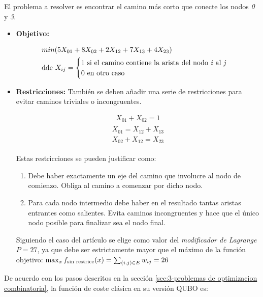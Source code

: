 El problema a resolver es encontrar el camino más corto que conecte los nodos \textit{0} y \textit{3}.
\begin{itemize}
\item \textbf{Objetivo:}

  \begin{align*}
    &min(5X_{01} + 8X_{02} + 2X_{12} + 7X_{13} + 4X_{23}) \\
    &\textnormal{dde } X_{ij} = \begin{cases}
      1 \textnormal{ si el camino contiene la arista del nodo \textit{i} al \textit{j}} \\
      0 \textnormal{ en otro caso}
    \end{cases}
  \end{align*}
  
\item \textbf{Restricciones:}
  También se deben añadir una serie de restricciones para evitar caminos triviales o incongruentes.

  \begin{align}
    X_{01} + X_{02} = 1
  \end{align}
  \begin{align}
    \begin{split}
      X_{01} = X_{12} + X_{13} \\
      X_{02} + X_{12} = X_{23}
    \end{split}
  \end{align}

  Estas restricciones se pueden justificar como:
  \begin{enumerate}
  \item Debe haber exactamente un eje del camino que involucre al nodo de comienzo. Obliga al camino a comenzar por dicho nodo.
  \item Para cada nodo intermedio debe haber en el resultado tantas aristas entrantes como salientes. Evita caminos incongruentes y hace que el único nodo posible para finalizar sea el nodo final.
    
  \end{enumerate}
  Siguiendo el caso del artículo se elige como valor del \textit{modificador de Lagrange} \(P=27\), ya que debe ser estrictamente mayor que el máximo de la función objetivo:
  \(\max_{x}{f_{\textnormal{sin restricc}}(x)} = \sum_{(i, j)\in{E}}{w_{ij}} = 26\)

\end{itemize}

De acuerdo con los pasos descritos en la sección \ref{sec:3-problemas de optimizacion combinatoria}, la función de coste clásica en su versión QUBO es:

